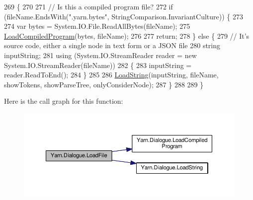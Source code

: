 \begin{DoxyCode}
269                                                                                                            
                            \{
270 
271             \textcolor{comment}{// Is this a compiled program file?}
272             \textcolor{keywordflow}{if} (fileName.EndsWith(\textcolor{stringliteral}{".yarn.bytes"}, StringComparison.InvariantCulture)) \{
273 
274                 var bytes = System.IO.File.ReadAllBytes(fileName);
275                 \hyperlink{a00088_a4bc1ceca26754dc3ec0a2281dfee26ce}{LoadCompiledProgram}(bytes, fileName);
276 
277                 \textcolor{keywordflow}{return};
278             \} \textcolor{keywordflow}{else} \{
279                 \textcolor{comment}{// It's source code, either a single node in text form or a JSON file}
280                 \textcolor{keywordtype}{string} inputString;
281                 \textcolor{keyword}{using} (System.IO.StreamReader reader = \textcolor{keyword}{new} System.IO.StreamReader(fileName))
282                 \{
283                     inputString = reader.ReadToEnd();
284                 \}
285 
286                 \hyperlink{a00088_a7b66187877ec8a2bfee2298d3dd16706}{LoadString}(inputString, fileName, showTokens, showParseTree, onlyConsiderNode);
287             \}
288 
289         \}
\end{DoxyCode}


Here is the call graph for this function\-:
\nopagebreak
\begin{figure}[H]
\begin{center}
\leavevmode
\includegraphics[width=350pt]{a00088_af868f7f6928d122ca1d1857be433d92b_cgraph}
\end{center}
\end{figure}


